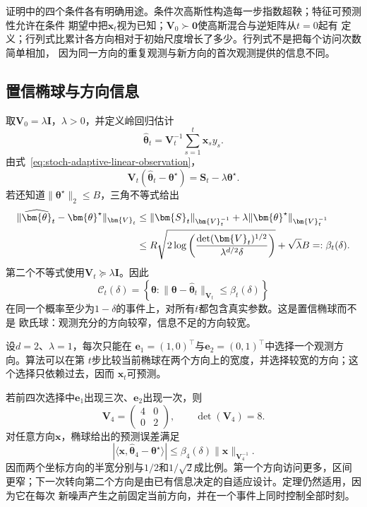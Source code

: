 证明中的四个条件各有明确用途。条件次高斯性构造每一步指数超鞅；特征可预测性允许在条件
期望中把$\bm{x}_t$视为已知；$\bm{V}_0\succ\bm{0}$使高斯混合与逆矩阵从$t=0$起有
定义；行列式比累计各方向相对于初始尺度增长了多少。行列式不是把每个访问次数简单相加，
因为同一方向的重复观测与新方向的首次观测提供的信息不同。

\subsection{置信椭球与方向信息}

取$\bm{V}_0=\lambda\bm{I}$，$\lambda>0$，并定义岭回归估计
\begin{equation}
  \widehat{\bm{\theta}}_t
  =\bm{V}_t^{-1}\sum_{s=1}^{t}\bm{x}_s y_s.
  \label{eq:stoch-ridge-estimator}
\end{equation}
由式~\eqref{eq:stoch-adaptive-linear-observation}，
\[
  \bm{V}_t
  (\widehat{\bm{\theta}}_t-\bm{\theta}^{\star})
  =
  \bm{S}_t-\lambda\bm{\theta}^{\star}.
  \]
若还知道$\lVert\bm{\theta}^{\star}\rVert_2\leq B$，三角不等式给出
\begin{align}
  \lVert
    \widehat{\bm{\theta}}_t-\bm{\theta}^{\star}
  \rVert_{\bm{V}_t}
  &\leq
  \lVert\bm{S}_t\rVert_{\bm{V}_t^{-1}}
  +
  \lambda
  \lVert\bm{\theta}^{\star}\rVert_{\bm{V}_t^{-1}}
  \notag\\
  &\leq
  R\sqrt{
    2\log\left(
      \frac{\det(\bm{V}_t)^{1/2}}
           {\lambda^{d/2}\delta}
    \right)
  }
  +\sqrt{\lambda}B
  =:\beta_t(\delta).
  \label{eq:stoch-adaptive-confidence-ellipsoid}
\end{align}
第二个不等式使用$\bm{V}_t\succeq\lambda\bm{I}$。因此
\[
  \mathcal{C}_t(\delta)
  =
  \left\{
    \bm{\theta}:
    \lVert\bm{\theta}-\widehat{\bm{\theta}}_t
    \rVert_{\bm{V}_t}
    \leq\beta_t(\delta)
  \right\}
\]
在同一个概率至少为$1-\delta$的事件上，对所有$t$都包含真实参数。这是置信椭球而不是
欧氏球：观测充分的方向较窄，信息不足的方向较宽。

\begin{example}[二维自适应查询]
  \label{ex:stoch-two-dimensional-adaptive-design}
  设$d=2$、$\lambda=1$，每次只能在
  $\bm{e}_1=(1,0)^\top$与$\bm{e}_2=(0,1)^\top$中选择一个观测方向。算法可以在第
  $t$步比较当前椭球在两个方向上的宽度，并选择较宽的方向；这个选择只依赖过去，因而
  $\bm{x}_t$可预测。

  若前四次选择中$\bm{e}_1$出现三次、$\bm{e}_2$出现一次，则
  \[
    \bm{V}_4
    =
    \begin{pmatrix}
      4&0\\
      0&2
    \end{pmatrix},
    \qquad
    \det(\bm{V}_4)=8.
  \]
  对任意方向$\bm{x}$，椭球给出的预测误差满足
  \[
    |\langle
      \bm{x},
      \widehat{\bm{\theta}}_4-\bm{\theta}^{\star}
    \rangle|
    \leq
    \beta_4(\delta)
    \lVert\bm{x}\rVert_{\bm{V}_4^{-1}}.
  \]
  因而两个坐标方向的半宽分别与$1/2$和$1/\sqrt2$成比例。第一个方向访问更多，区间
  更窄；下一次转向第二个方向是由已有信息决定的自适应设计。定理仍然适用，因为它在每次
  新噪声产生之前固定当前方向，并在一个事件上同时控制全部时刻。
\end{example}

